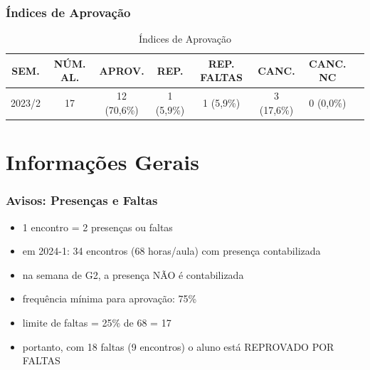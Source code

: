 \documentclass[aspectratio=169]{beamer}
\begin{document}

\begin{frame}\frametitle{\'Indices de Aprova\c{c}\~ao}
	\begin{table}
		\centering
		\begin{tabular}{cccccccc}
			\toprule
			SEM. & N\'UM. AL. & APROV. & REP. & REP. FALTAS & CANC. & CANC. NC\\
			\midrule
			2023/2 & 17 & 12 (70,6\%) & 1 (5,9\%) & 1 (5,9\%) & 3 (17,6\%)& 0 (0,0\%)\\
			\bottomrule
		\end{tabular}
		\caption{\'Indices de Aprova\c{c}\~ao}
	\end{table}
\end{frame}

\section{Informa\c{c}\~oes Gerais}

\begin{frame}\frametitle{Avisos: Presenças e Faltas}
\begin{itemize}
	\item 1 encontro = 2 presen\c{c}as ou faltas
	\item em 2024-1: 34 encontros (68 horas/aula) com presença contabilizada
	\item na semana de G2, a presença NÃO é contabilizada
	\item frequ\^encia m\'inima para aprova\c{c}\~ao: 75\%
	\item limite de faltas = 25\% de 68 = 17
	\item portanto, com 18 faltas (9 encontros) o aluno está REPROVADO POR FALTAS
\end{itemize}
\end{frame}
\end{document}

